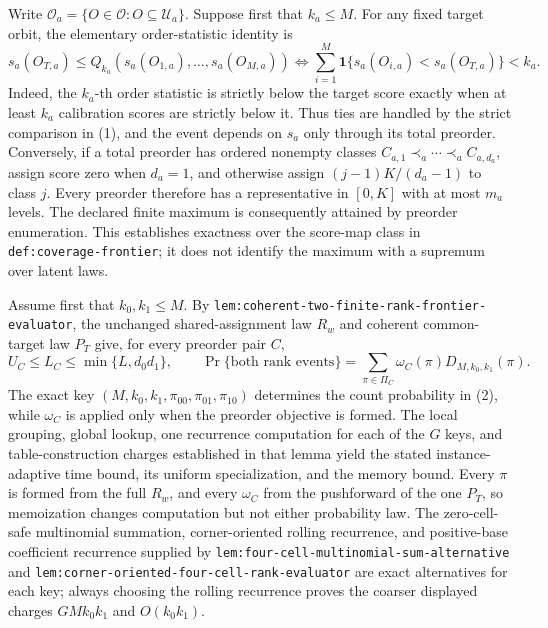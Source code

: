 Write \(\mathcal O_a=\{O\in\mathcal O:O\subseteq\mathcal U_a\}\). Suppose first that \(k_a\le M\). For any fixed target orbit, the elementary order-statistic identity is
\[
s_a(O_{T,a})\le Q_{k_a}(s_a(O_{1,a}),\ldots,s_a(O_{M,a}))\Longleftrightarrow\sum_{i=1}^M\mathbf 1\{s_a(O_{i,a})<s_a(O_{T,a})\}<k_a.
\tag{1}
\]
Indeed, the \(k_a\)-th order statistic is strictly below the target score exactly when at least \(k_a\) calibration scores are strictly below it. Thus ties are handled by the strict comparison in (1), and the event depends on \(s_a\) only through its total preorder. Conversely, if a total preorder has ordered nonempty classes \(C_{a,1}\prec_a\cdots\prec_a C_{a,d_a}\), assign score zero when \(d_a=1\), and otherwise assign \((j-1)K/(d_a-1)\) to class \(j\). Every preorder therefore has a representative in \([0,K]\) with at most \(m_a\) levels. The declared finite maximum is consequently attained by preorder enumeration. This establishes exactness over the score-map class in \texttt{def:coverage-frontier}; it does not identify the maximum with a supremum over latent laws.

Assume first that \(k_0,k_1\le M\). By \texttt{lem:coherent-two-finite-rank-frontier-evaluator}, the unchanged shared-assignment law \(R_w\) and coherent common-target law \(P_T\) give, for every preorder pair \(C\),
\[
U_C\le L_C\le\min\{L,d_0d_1\},\qquad \Pr\{\text{both rank events}\}=\sum_{\pi\in\Pi_C}\omega_C(\pi)D_{M,k_0,k_1}(\pi).
\tag{2}
\]
The exact key \((M,k_0,k_1,\pi_{00},\pi_{01},\pi_{10})\) determines the count probability in (2), while \(\omega_C\) is applied only when the preorder objective is formed. The local grouping, global lookup, one recurrence computation for each of the \(G\) keys, and table-construction charges established in that lemma yield the stated instance-adaptive time bound, its uniform specialization, and the memory bound. Every \(\pi\) is formed from the full \(R_w\), and every \(\omega_C\) from the pushforward of the one \(P_T\), so memoization changes computation but not either probability law. The zero-cell-safe multinomial summation, corner-oriented rolling recurrence, and positive-base coefficient recurrence supplied by \texttt{lem:four-cell-multinomial-sum-alternative} and \texttt{lem:corner-oriented-four-cell-rank-evaluator} are exact alternatives for each key; always choosing the rolling recurrence proves the coarser displayed charges \(GMk_0k_1\) and \(O(k_0k_1)\).

